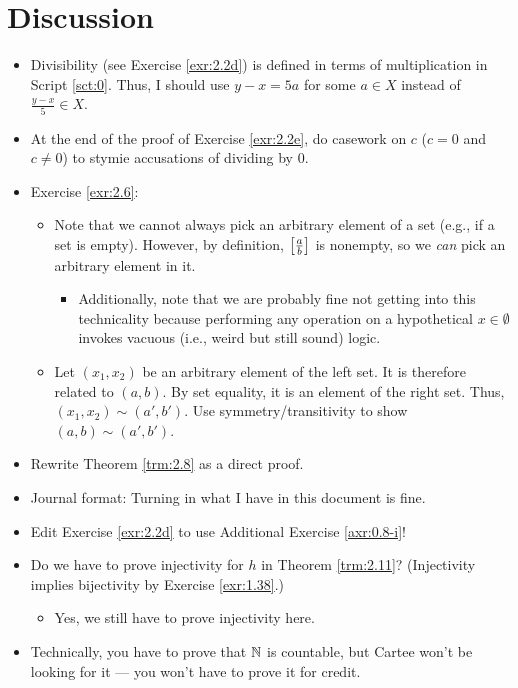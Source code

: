 \documentclass[titlepage]{report}
\begin{document}
\section{Discussion}
\begin{itemize}
    \item {}Divisibility (see Exercise \ref{exr:2.2d}) is defined in terms of multiplication in Script \ref{sct:0}. Thus, I should use $y-x=5a$ for some $a\in X$ instead of $\frac{y-x}{5}\in X$.
    \item At the end of the proof of Exercise \ref{exr:2.2e}, do casework on $c$ ($c=0$ and $c\neq 0$) to stymie accusations of dividing by 0.
    \item Exercise \ref{exr:2.6}:
    \begin{itemize}
        \item Note that we cannot always pick an arbitrary element of a set (e.g., if a set is empty). However, by definition, $\left[ \frac{a}{b} \right]$ is nonempty, so we \emph{can} pick an arbitrary element in it.
        \begin{itemize}
            \item Additionally, note that we are probably fine not getting into this technicality because performing any operation on a hypothetical $x\in\emptyset$ invokes vacuous (i.e., weird but still sound) logic.
        \end{itemize}
        \item Let $(x_1,x_2)$ be an arbitrary element of the left set. It is therefore related to $(a,b)$. By set equality, it is an element of the right set. Thus, $(x_1,x_2)\sim(a',b')$. Use symmetry/transitivity to show $(a,b)\sim(a',b')$.
    \end{itemize}
    \item Rewrite Theorem \ref{trm:2.8} as a direct proof.
    \item Journal format: Turning in what I have in this document is fine.
    \item {}Edit Exercise \ref{exr:2.2d} to use Additional Exercise \ref{axr:0.8-i}!
    \item Do we have to prove injectivity for $h$ in Theorem \ref{trm:2.11}? (Injectivity implies bijectivity by Exercise \ref{exr:1.38}.)
    \begin{itemize}
        \item Yes, we still have to prove injectivity here.
    \end{itemize}
    \item Technically, you have to prove that $\mathbb{N}$ is countable, but Cartee won't be looking for it --- you won't have to prove it for credit.

\end{itemize}
\end{document}
